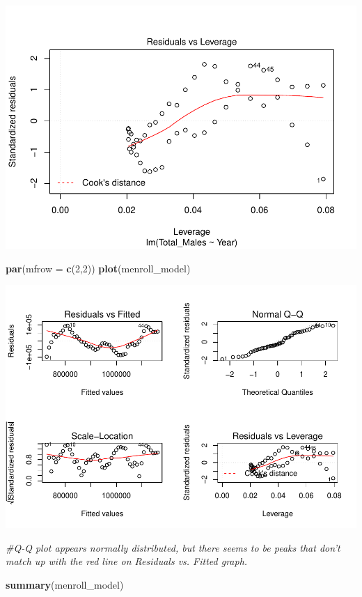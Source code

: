 \documentclass[]{article}
\newenvironment{Shaded}{\begin{snugshade}}{\end{snugshade}}
\newcommand{\KeywordTok}[1]{\textcolor[rgb]{0.13,0.29,0.53}{\textbf{#1}}}
\newcommand{\DataTypeTok}[1]{\textcolor[rgb]{0.13,0.29,0.53}{#1}}
\newcommand{\DecValTok}[1]{\textcolor[rgb]{0.00,0.00,0.81}{#1}}
\newcommand{\CommentTok}[1]{\textcolor[rgb]{0.56,0.35,0.01}{\textit{#1}}}
\newcommand{\NormalTok}[1]{#1}
\begin{document}
\includegraphics{Assignment_5_Markdown_files/figure-latex/unnamed-chunk-4-4.pdf}

\begin{Shaded}
\begin{Highlighting}[]
\KeywordTok{par}\NormalTok{(}\DataTypeTok{mfrow =} \KeywordTok{c}\NormalTok{(}\DecValTok{2}\NormalTok{,}\DecValTok{2}\NormalTok{))}
\KeywordTok{plot}\NormalTok{(menroll_model)}
\end{Highlighting}
\end{Shaded}

\includegraphics{Assignment_5_Markdown_files/figure-latex/unnamed-chunk-4-5.pdf}

\begin{Shaded}
\begin{Highlighting}[]
\CommentTok{#Q-Q plot appears normally distributed, but there seems to be peaks that don't match up with the red line on Residuals vs. Fitted graph.}

\KeywordTok{summary}\NormalTok{(menroll_model)}
\end{Highlighting}
\end{Shaded}
\end{document}
